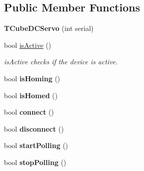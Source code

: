 \subsection*{Public Member Functions}
\begin{DoxyCompactItemize}
\item 
{\bfseries T\+Cube\+D\+C\+Servo} (int serial)\hypertarget{class_t_cube_d_c_servo_a31ea7bdfce103f01dbc82e7ec3abede7}{}\label{class_t_cube_d_c_servo_a31ea7bdfce103f01dbc82e7ec3abede7}

\item 
bool \hyperlink{class_t_cube_d_c_servo_a756f667bda8e714d7e3e2fd19f84ff42}{is\+Active} ()\hypertarget{class_t_cube_d_c_servo_a756f667bda8e714d7e3e2fd19f84ff42}{}\label{class_t_cube_d_c_servo_a756f667bda8e714d7e3e2fd19f84ff42}

\begin{DoxyCompactList}\small\item\em is\+Active checks if the device is active. \end{DoxyCompactList}\item 
bool {\bfseries is\+Homing} ()\hypertarget{class_t_cube_d_c_servo_a4d85d3523736a4013d2f727313426f68}{}\label{class_t_cube_d_c_servo_a4d85d3523736a4013d2f727313426f68}

\item 
bool {\bfseries is\+Homed} ()\hypertarget{class_t_cube_d_c_servo_a2e56f6537586a0050c6b6edb745a627e}{}\label{class_t_cube_d_c_servo_a2e56f6537586a0050c6b6edb745a627e}

\item 
bool {\bfseries connect} ()\hypertarget{class_t_cube_d_c_servo_afb574051761c7704d30f5d4601f7a87f}{}\label{class_t_cube_d_c_servo_afb574051761c7704d30f5d4601f7a87f}

\item 
bool {\bfseries disconnect} ()\hypertarget{class_t_cube_d_c_servo_a5c6947759798bcf4ddde5e6184f947ab}{}\label{class_t_cube_d_c_servo_a5c6947759798bcf4ddde5e6184f947ab}

\item 
bool {\bfseries start\+Polling} ()\hypertarget{class_t_cube_d_c_servo_acae5a43c5ec4741da9c71a23135177c3}{}\label{class_t_cube_d_c_servo_acae5a43c5ec4741da9c71a23135177c3}

\item 
bool {\bfseries stop\+Polling} ()\hypertarget{class_t_cube_d_c_servo_aa3e0f3ada53bbb08aae20b71e54ae33a}{}\label{class_t_cube_d_c_servo_aa3e0f3ada53bbb08aae20b71e54ae33a}


\end{DoxyCompactItemize}
